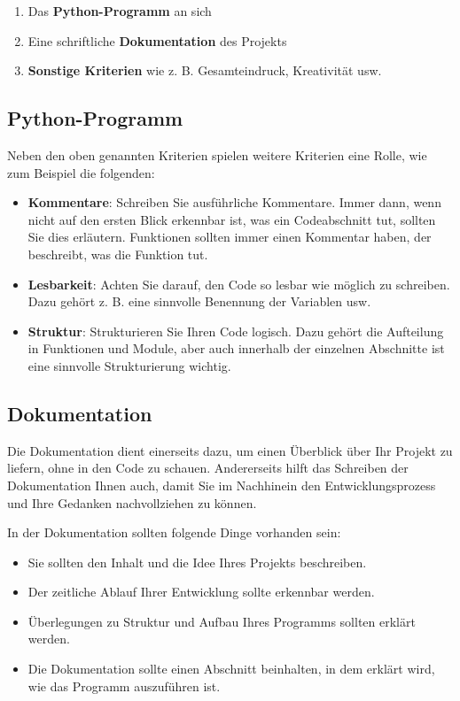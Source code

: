 \documentclass[11pt, a4paper, oneside]{article}
\begin{document}
	\begin{enumerate}
		\item Das \textbf{Python-Programm} an sich
		\item Eine schriftliche \textbf{Dokumentation} des Projekts
		\item \textbf{Sonstige Kriterien} wie z. B. Gesamteindruck, Kreativität usw.
	\end{enumerate}
	
	\subsection{Python-Programm}
	
	Neben den oben genannten Kriterien spielen weitere Kriterien eine Rolle, wie zum Beispiel die folgenden:
	
	\begin{itemize}
		\item \textbf{Kommentare}: Schreiben Sie ausführliche Kommentare.
		Immer dann, wenn nicht auf den ersten Blick erkennbar ist, was ein Codeabschnitt tut, sollten Sie dies erläutern.
		Funktionen sollten immer einen Kommentar haben, der beschreibt, was die Funktion tut.
		\item \textbf{Lesbarkeit}: Achten Sie darauf, den Code so lesbar wie möglich zu schreiben.
		Dazu gehört z. B. eine sinnvolle Benennung der Variablen usw.
		\item \textbf{Struktur}: Strukturieren Sie Ihren Code logisch.
		Dazu gehört die Aufteilung in Funktionen und Module, aber auch innerhalb der einzelnen Abschnitte ist eine sinnvolle Strukturierung wichtig.
	\end{itemize}
	
	\subsection{Dokumentation}
	
	Die Dokumentation dient einerseits dazu, um einen Überblick über Ihr Projekt zu liefern, ohne in den Code zu schauen.
	Andererseits hilft das Schreiben der Dokumentation Ihnen auch, damit Sie im Nachhinein den Entwicklungsprozess und Ihre Gedanken nachvollziehen zu können.
	
	In der Dokumentation sollten folgende Dinge vorhanden sein:
	
	\begin{itemize}
		\item Sie sollten den Inhalt und die Idee Ihres Projekts beschreiben.
		\item Der zeitliche Ablauf Ihrer Entwicklung sollte erkennbar werden.
		\item Überlegungen zu Struktur und Aufbau Ihres Programms sollten erklärt werden.
		\item Die Dokumentation sollte einen Abschnitt beinhalten, in dem erklärt wird, wie das Programm auszuführen ist.
	\end{itemize}
	
\end{document}
